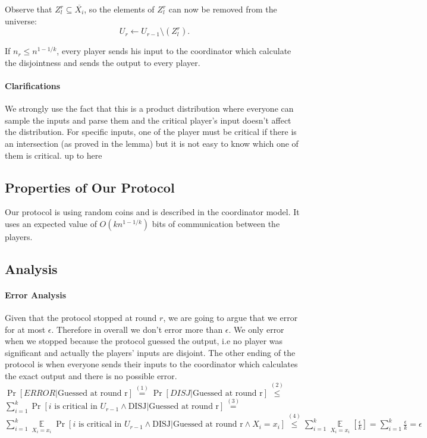 \documentclass{article}
\newcommand{\TODO}[1]{ {\color{red} #1 }}
\theoremstyle{plain}
\begin{document}
Observe that $Z^{r}_l \subseteq \overline{X_i}$,
so the elements of $Z^{r}_l$ can now be removed from the universe:
\begin{equation*}
  U_r \leftarrow U_{r-1} \setminus (Z^{r}_l).
\end{equation*}

If $n_r \leq n^{1-1/k}$, every player sends his input to the coordinator which calculate the disjointness and sends the output to every player.

\paragraph{Clarifications}
We strongly use the fact that this is a product distribution where everyone can sample the inputs and parse them and the critical player's input doesn't affect the distribution. \newline
For specific inputs, one of the player must be critical if there is an intersection (as proved in the lemma) but it is not easy to know which one of them is critical. 
\TODO{up to here}



\subsection{Properties of Our Protocol}
Our protocol is using random coins and is described in the coordinator model. It uses an expected value of $O(kn^{1-1/k})$ bits of communication between the players.
\subsection{Analysis}
\paragraph{Error Analysis}
Given that the protocol stopped at round $r$, we are going to argue that we error for at most $\epsilon$. Therefore in overall we don't error more than $\epsilon$.
We only error when we stopped because the protocol guessed the output, i.e no player was significant and actually the players' inputs are disjoint. The other ending of the protocol is when everyone sends their inputs to the coordinator which calculates the exact output and there is no possible error. \newline
$\Pr[ERROR | \text{Guessed at round r}] \overset{(1)}{=} \Pr[DISJ | \text{Guessed at round r}] \overset{(2)}{\leq} $\newline
$\sum\limits_{i=1}^k \Pr[\text{$i$ is critical in $U_{r-1}$} \land \text{DISJ}| \text{Guessed at round r}] \overset{(3)}{=} $ \newline
$\sum\limits_{i=1}^k \underset{X_i=x_i}{\mathop{\mathbb{E}}}\Pr[\text{$i$ is critical in $U_{r-1}$} \land \text{DISJ}| \text{Guessed at round r} \land X_i=x_i] \overset{(4)}{\leq} \sum\limits_{i=1}^k \underset{X_i=x_i}{\mathop{\mathbb{E}}}[\frac{\epsilon}{k}] = \sum\limits_{i=1}^k \frac{\epsilon}{k} = \epsilon$ \newline
\end{document}
